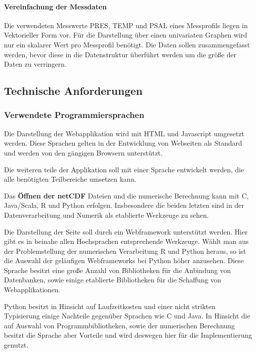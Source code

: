  

\paragraph{Vereinfachung der Messdaten}
Die verwendeten Messwerte PRES, TEMP und PSAL eines Messprofils liegen in Vektorieller Form vor. Für die Darstellung über einen univariaten Graphen wird nur ein skalarer Wert pro Messprofil benötigt. Die Daten sollen zusammengefasst werden, bevor diese in die Datenstruktur überführt werden um die größe der Daten zu verringern. 
 

\subsection{Technische Anforderungen  }

\subsubsection{Verwendete Programmiersprachen}

Die Darstellung der Webapplikation wird mit HTML und Javascript umgesetzt werden. Diese Sprachen gelten in der Entwicklung von Webseiten als Standard und werden von den gängigen Browsern unterstützt.

Die weiteren teile der Applikation soll mit einer Sprache entwickelt werden, die alle benötigten Teilbereiche umsetzen kann.

Das \textbf{Öffnen der netCDF} Dateien und die numerische Berechnung kann mit C, Java/Scala, R und Python erfolgen. Insbesondere die beiden letzten sind in der Datenverarbeitung und Numerik als etablierte Werkzeuge zu sehen.

Die Darstellung der Seite soll durch ein Webframework unterstützt werden. Hier gibt es in beinahe allen Hochsprachen entsprechende Werkzeuge. Wählt man aus der Problemstellung der numerischen Verarbeitung R und Python heraus, so ist die Auswahl der geläufigen Webframeworks bei Python höher anzusehen. Diese Sprache besitzt eine große Anzahl von Bibliotheken für die Anbindung von Datenbanken, sowie einige etablierte Bibliotheken für die Schaffung von Webapplikationen.  

Python besitzt in Hinsicht auf Laufzeitkosten und einer nicht strikten Typisierung einige Nachteile gegenüber Sprachen wie C und Java. In Hinsicht die auf Auswahl von Programmbibliotheken, sowie der numerischen Berechnung besitzt die Sprache aber Vorteile und wird deswegen hier für die Implementierung genutzt.



